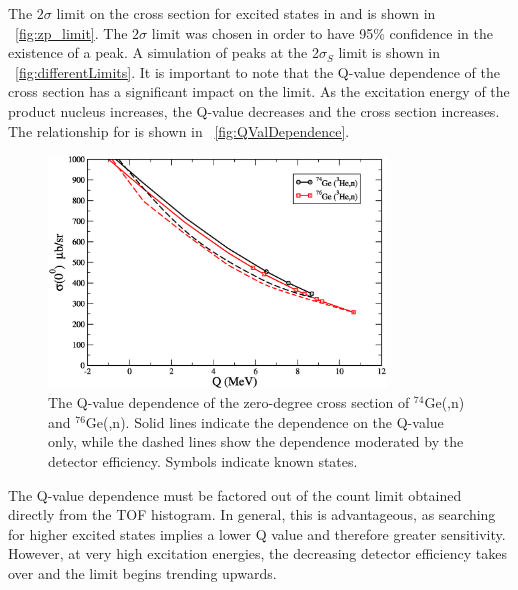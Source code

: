 The $2\sigma$ limit on the cross section for excited \zp states in  and  is shown in {\fig}~\ref{fig:zp_limit}.  The $2\sigma$ limit was chosen in order to have 95\% confidence in the existence of a peak.  A simulation of peaks at the 2$\sigma_S$ limit is shown in {\fig}~\ref{fig:differentLimits}.  It is important to note that the Q-value dependence of the cross section has a significant impact on the limit.  As the excitation energy of the product nucleus increases, the Q-value decreases and the cross section increases.  The relationship for \reaction is shown in {\fig}~\ref{fig:QValDependence}.
\begin{figure}[!htbp]
\centering
\includegraphics[width=0.8\textwidth]{figures/SigmaVsQ.eps}
\caption{The Q-value dependence of the zero-degree cross section of $^{74}$Ge(,n) and $^{76}$Ge(,n).  Solid lines indicate the dependence on the Q-value only, while the dashed lines show the dependence moderated by the detector efficiency.  Symbols indicate known \zp states.}
\label{fig:QvalDependence}
\end{figure}
The Q-value dependence must be factored out of the count limit obtained directly from the TOF histogram.  In general, this is advantageous, as searching for higher excited \zp states implies a lower Q value and therefore greater sensitivity.  However, at very high excitation energies, the decreasing detector efficiency takes over and the limit begins trending upwards.
